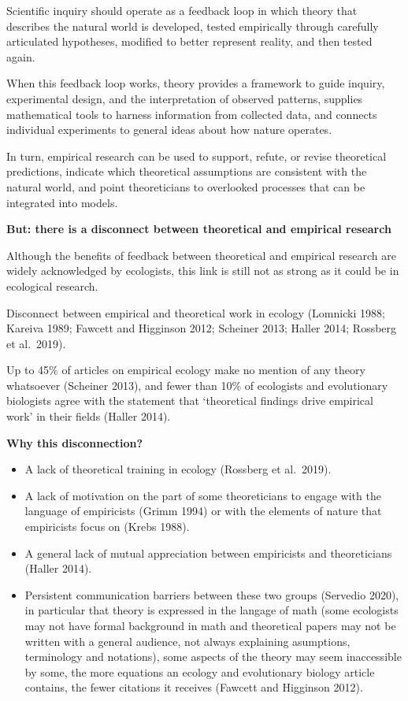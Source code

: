 \documentclass[
]{book}
\providecommand{\tightlist}{%
  \setlength{\itemsep}{0pt}\setlength{\parskip}{0pt}}
\theoremstyle{definition}
\theoremstyle{definition}
\theoremstyle{definition}
\theoremstyle{definition}
\theoremstyle{remark}
\begin{document}
Scientific inquiry should operate as a feedback loop in which theory that describes the natural world is developed, tested empirically through carefully articulated hypotheses, modified to better represent reality, and then tested again.

When this feedback loop works, theory provides a framework to guide inquiry, experimental design, and the interpretation of observed patterns, supplies mathematical tools to harness information from collected data, and connects individual experiments to general ideas about how nature operates.

In turn, empirical research can be used to support, refute, or revise theoretical predictions, indicate which theoretical assumptions are consistent with the natural world, and point theoreticians to overlooked processes that can be integrated into models.

\textbf{But: there is a disconnect between theoretical and empirical research}

Although the benefits of feedback between theoretical and empirical research are widely acknowledged by ecologists, this link is still not as strong as it could be in ecological research.

Disconnect between empirical and theoretical work in ecology (Lomnicki 1988; Kareiva 1989; Fawcett and Higginson 2012; Scheiner 2013; Haller 2014; Rossberg et al.~2019).

Up to 45\% of articles on empirical ecology make no mention of any theory whatsoever (Scheiner 2013), and fewer than 10\% of ecologists and evolutionary biologists agree with the statement that `theoretical findings drive empirical work' in their fields (Haller 2014).

\textbf{Why this disconnection?}

\begin{itemize}
\tightlist
\item
  A lack of theoretical training in ecology (Rossberg et al.~2019).
\item
  A lack of motivation on the part of some theoreticians to engage with the language of empiricists (Grimm 1994) or with the elements of nature that empiricists focus on (Krebs 1988).
\item
  A general lack of mutual appreciation between empiricists and theoreticians (Haller 2014).
\item
  Persistent communication barriers between these two groups (Servedio 2020), in particular that theory is expressed in the langage of math (some ecologists may not have formal background in math and theoretical papers may not be written with a general audience, not always explaining asumptions, terminology and notations), some aspects of the theory may seem inaccessible by some, the more equations an ecology and evolutionary biology article contains, the fewer citations it receives (Fawcett and Higginson 2012).
\end{itemize}
\end{document}
